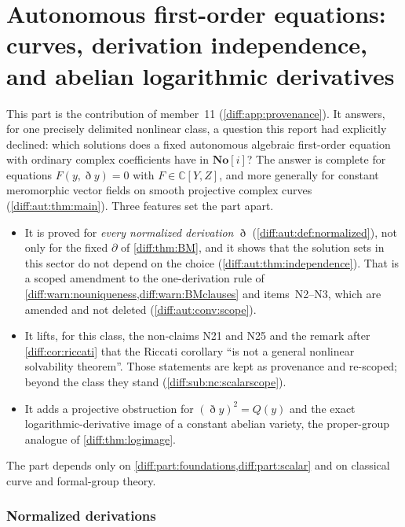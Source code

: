 \documentclass[11pt,letterpaper]{article}
\numberwithin{equation}{section}
\theoremstyle{definition}
\theoremstyle{remark}
\newcommand{\SC}{\mathbf{No}[i]}
\newcommand{\C}{\mathbb C}
\newcommand{\der}{\partial}
\newcommand{\Dn}{\eth}
\begin{document}
\part{Autonomous first-order equations: curves, derivation independence, and abelian logarithmic derivatives}
\label{diff:aut:part}

This part is the contribution of member~11 (\cref{diff:app:provenance}). It
answers, for one precisely delimited nonlinear class, a question this report
had explicitly declined: which solutions does a fixed autonomous algebraic
first-order equation with ordinary complex coefficients have in $\SC$? The
answer is complete for equations $F(y,\Dn y)=0$ with $F\in\C[Y,Z]$, and more
generally for constant meromorphic vector fields on smooth projective complex
curves (\cref{diff:aut:thm:main}). Three features set the part apart.
\begin{itemize}[leftmargin=1.6em]
\item It is proved for \emph{every normalized derivation} $\Dn$
(\cref{diff:aut:def:normalized}), not only for the fixed $\der$ of
\cref{diff:thm:BM}, and it shows that the solution sets in this sector do not
depend on the choice (\cref{diff:aut:thm:independence}). That is a scoped
amendment to the one-derivation rule of
\cref{diff:warn:nouniqueness,diff:warn:BMclauses} and items~N2--N3, which are
amended and not deleted (\cref{diff:aut:conv:scope}).
\item It lifts, for this class, the non-claims N21 and N25 and the remark after
\cref{diff:cor:riccati} that the Riccati corollary ``is not a general nonlinear
solvability theorem''. Those statements are kept as provenance and re-scoped;
beyond the class they stand (\cref{diff:sub:nc:scalarscope}).
\item It adds a projective obstruction for $(\Dn y)^{2}=Q(y)$ and the exact
logarithmic-derivative image of a constant abelian variety, the proper-group
analogue of \cref{diff:thm:logimage}.
\end{itemize}
The part depends only on \cref{diff:part:foundations,diff:part:scalar} and on
classical curve and formal-group theory.

\section{Normalized derivations}
\label{diff:aut:sec:derivations}
\end{document}
